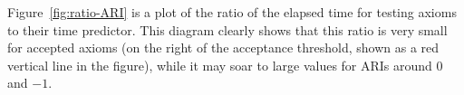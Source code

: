 \documentclass{sig-alternate}
\begin{document}


Figure~\ref{fig:ratio-ARI} is a plot of the ratio of the elapsed time for testing axioms
to their time predictor. This diagram clearly shows that this ratio is very small for
accepted axioms (on the right of the acceptance threshold, shown as a red vertical line in the figure),
while it may soar to large values for ARIs around 0 and $-1$.
\end{document}
